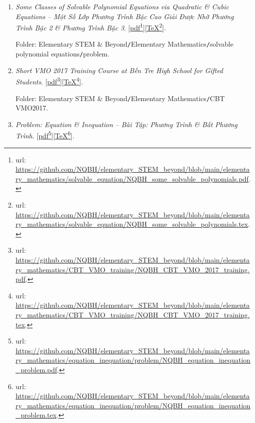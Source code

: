 \documentclass[12pt,oneside]{book}
\begin{document}
\begin{enumerate}
	\item {\it Some Classes of Solvable Polynomial Equations via Quadratic \& Cubic Equations -- Một Số Lớp Phương Trình Bậc Cao Giải Được Nhờ Phương Trình Bậc 2 \& Phương Trình Bậc 3}. [\href{https://github.com/NQBH/elementary_STEM_beyond/blob/main/elementary_mathematics/solvable_equation/NQBH_some_solvable_polynomials.pdf}{pdf}\footnote{{\sc url}: \url{https://github.com/NQBH/elementary_STEM_beyond/blob/main/elementary_mathematics/solvable_equation/NQBH_some_solvable_polynomials.pdf}.}][\href{https://github.com/NQBH/elementary_STEM_beyond/blob/main/elementary_mathematics/solvable_equation/NQBH_some_solvable_polynomials.tex}{\TeX}\footnote{{\sc url}: \url{https://github.com/NQBH/elementary_STEM_beyond/blob/main/elementary_mathematics/solvable_equation/NQBH_some_solvable_polynomials.tex}.}].
	
	Folder: {\sf Elementary STEM \& Beyond{\tt/}Elementary Mathematics{\tt/}solvable polynomial equations{\tt/}problem}.
	\item {\it Short VMO 2017 Training Course at Bến Tre High School for Gifted Students}. [\href{https://github.com/NQBH/elementary_STEM_beyond/blob/main/elementary_mathematics/CBT_VMO_training/NQBH_CBT_VMO_2017_training.pdf}{pdf}\footnote{{\sc url}: \url{https://github.com/NQBH/elementary_STEM_beyond/blob/main/elementary_mathematics/CBT_VMO_training/NQBH_CBT_VMO_2017_training.pdf}.}][\href{https://github.com/NQBH/elementary_STEM_beyond/blob/main/elementary_mathematics/CBT_VMO_training/NQBH_CBT_VMO_2017_training.tex}{\TeX}\footnote{{\sc url}: \url{https://github.com/NQBH/elementary_STEM_beyond/blob/main/elementary_mathematics/CBT_VMO_training/NQBH_CBT_VMO_2017_training.tex}.}].
	
	Folder: {\sf Elementary STEM \& Beyond{\tt/}Elementary Mathematics{\tt/}CBT VMO2017}.
	\item {\it Problem: Equation \& Inequation -- Bài Tập: Phương Trình \& Bất Phương Trình}. [\href{https://github.com/NQBH/elementary_STEM_beyond/blob/main/elementary_mathematics/equation_inequation/problem/NQBH_equation_inequation_problem.pdf}{pdf}\footnote{{\sc url}: \url{https://github.com/NQBH/elementary_STEM_beyond/blob/main/elementary_mathematics/equation_inequation/problem/NQBH_equation_inequation_problem.pdf}.}][\href{https://github.com/NQBH/elementary_STEM_beyond/blob/main/elementary_mathematics/equation_inequation/problem/NQBH_equation_inequation_problem.tex}{\TeX}\footnote{{\sc url}: \url{https://github.com/NQBH/elementary_STEM_beyond/blob/main/elementary_mathematics/equation_inequation/problem/NQBH_equation_inequation_problem.tex}.}].
	

\end{enumerate}
\end{document}
